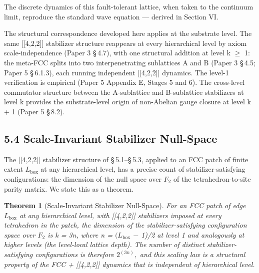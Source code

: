 \documentclass[11pt,oneside]{report}
\newtheorem{theorem}{Theorem}[section]
\theoremstyle{definition}
\theoremstyle{remark}
\begin{document}
The discrete dynamics of this fault-tolerant lattice, when taken to the
continuum limit, reproduce the standard wave equation --- derived in
Section VI.

The structural correspondence developed here applies at the substrate
level. The same [[4,2,2]] stabilizer structure reappears at
every hierarchical level by axiom scale-independence (Paper 3 \S\,4.7),
with one structural addition at level k \ensuremath{\geq} 1: the meta-FCC splits into
two interpenetrating sublattices A and B (Paper 3 \S\,4.5; Paper 5 \S\,6.1.3),
each running independent [[4,2,2]] dynamics. The level-1
verification is empirical (Paper 5 Appendix E, Stages 5 and 6). The
cross-level commutator structure between the A-sublattice and
B-sublattice stabilizers at level k provides the substrate-level origin
of non-Abelian gauge closure at level k + 1 (Paper 5 \S\,8.2).

\subsection*{5.4 Scale-Invariant Stabilizer Null-Space}

The [[4,2,2]] stabilizer structure of \S\,5.1--\S\,5.3, applied to an
FCC patch of finite extent \ensuremath{L_{\mathrm{box}}} at any hierarchical level, has a
precise count of stabilizer-satisfying configurations: the dimension of
the null space over \ensuremath{F_{2}} of the tetrahedron-to-site parity matrix. We
state this as a theorem.

\begin{theorem}[Scale-Invariant Stabilizer Null-Space]
For an
FCC patch of edge \ensuremath{L_{\mathrm{box}}} at any hierarchical level, with
[[4,2,2]] stabilizers imposed at every tetrahedron in the patch,
the dimension of the stabilizer-satisfying configuration space over \ensuremath{F_{2}}
is k = 3n, where n = \ensuremath{(L_{\mathrm{box}}} \ensuremath{-} 1)/2 at level 1 and analogously at higher
levels (the level-local lattice depth). The number of distinct
stabilizer-satisfying configurations is therefore \ensuremath{2^{(3n)},} and this
scaling law is a structural property of the FCC + [[4,2,2]]
dynamics that is independent of hierarchical level.
\end{theorem}
\end{document}
